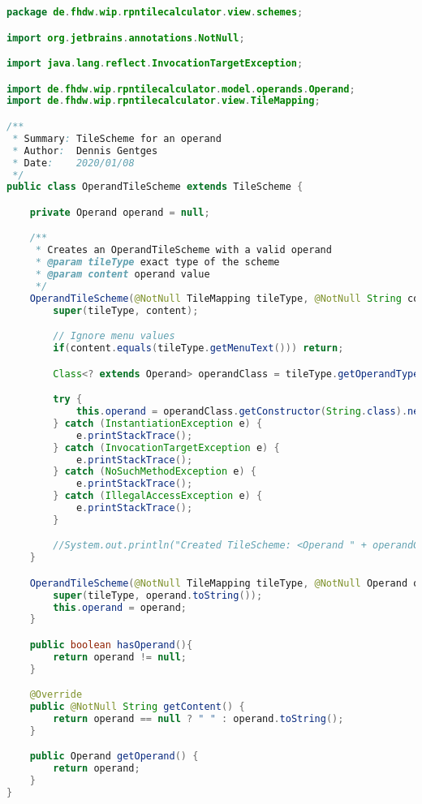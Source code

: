 \begin{lstlisting}[caption=OperandTileScheme,label=list:OperandTileScheme,language=Java]
package de.fhdw.wip.rpntilecalculator.view.schemes;

import org.jetbrains.annotations.NotNull;

import java.lang.reflect.InvocationTargetException;

import de.fhdw.wip.rpntilecalculator.model.operands.Operand;
import de.fhdw.wip.rpntilecalculator.view.TileMapping;

/**
 * Summary: TileScheme for an operand
 * Author:  Dennis Gentges
 * Date:    2020/01/08
 */
public class OperandTileScheme extends TileScheme {

    private Operand operand = null;

    /**
     * Creates an OperandTileScheme with a valid operand
     * @param tileType exact type of the scheme
     * @param content operand value
     */
    OperandTileScheme(@NotNull TileMapping tileType, @NotNull String content) {
        super(tileType, content);

        // Ignore menu values
        if(content.equals(tileType.getMenuText())) return;

        Class<? extends Operand> operandClass = tileType.getOperandType();

        try {
            this.operand = operandClass.getConstructor(String.class).newInstance(content);
        } catch (InstantiationException e) {
            e.printStackTrace();
        } catch (InvocationTargetException e) {
            e.printStackTrace();
        } catch (NoSuchMethodException e) {
            e.printStackTrace();
        } catch (IllegalAccessException e) {
            e.printStackTrace();
        }

        //System.out.println("Created TileScheme: <Operand " + operandClass + ":" + content + ">");
    }

    OperandTileScheme(@NotNull TileMapping tileType, @NotNull Operand operand) {
        super(tileType, operand.toString());
        this.operand = operand;
    }

    public boolean hasOperand(){
        return operand != null;
    }

    @Override
    public @NotNull String getContent() {
        return operand == null ? " " : operand.toString();
    }

    public Operand getOperand() {
        return operand;
    }
}
\end{lstlisting}    

